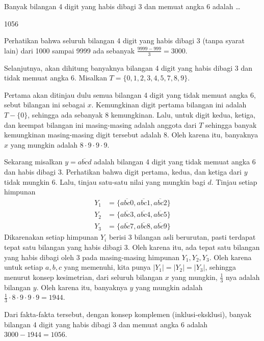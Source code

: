 \documentclass[12pt]{scrartcl}
\begin{document}
\begin{soalbaru}
Banyak bilangan 4 digit yang habis dibagi 3 dan memuat angka 6 adalah \dots
\end{soalbaru}
\begin{jawaban}
1056
\end{jawaban}
\begin{solusi}
Perhatikan bahwa seluruh bilangan 4 digit yang habis dibagi 3 (tanpa syarat lain) dari 1000 sampai 9999 ada sebanyak $\frac{9999-999}{3}=3000$. 

Selanjutnya, akan dihitung banyaknya bilangan 4 digit yang habis dibagi 3 dan tidak memuat angka 6. Misalkan $T = \{0,1,2,3,4,5,7,8,9\}$. 

Pertama akan ditinjau dulu semua bilangan 4 digit yang tidak memuat angka 6, sebut bilangan ini sebagai $x$. Kemungkinan digit pertama bilangan ini adalah $T - \{0\}$, sehingga ada sebanyak $8$ kemungkinan. Lalu, untuk digit kedua, ketiga, dan keempat bilangan ini masing-masing adalah anggota dari $T$ sehingga banyak kemungkinan masing-masing digit tersebut adalah 8. Oleh karena itu, banyaknya $x$ yang mungkin adalah $8 \cdot 9 \cdot 9 \cdot 9$.

Sekarang misalkan $y = \overline{abcd}$ adalah bilangan 4 digit yang tidak memuat angka 6 dan habis dibagi 3. Perhatikan bahwa digit pertama, kedua, dan ketiga dari $y$ tidak mungkin 6. Lalu, tinjau satu-satu nilai yang mungkin bagi $d$. Tinjau setiap himpunan 
\begin{align*}
Y_1 &=\{\overline{abc0},\overline{abc1},\overline{abc2}\}\\ 
Y_2 &=\{\overline{abc3},\overline{abc4},\overline{abc5}\}\\
Y_3 &=\{\overline{abc7},\overline{abc8},\overline{abc9}\}
\end{align*}
Dikarenakan setiap himpunan $Y_i$ berisi 3 bilangan asli berurutan, pasti terdapat tepat satu bilangan yang habis dibagi 3. Oleh karena itu, ada tepat satu bilangan yang habis dibagi oleh 3 pada masing-masing himpunan $Y_1,Y_2,Y_3$. Oleh karena untuk setiap $a,b,c$ yang memenuhi, kita punya $|Y_1|=|Y_2|=|Y_3|$, sehingga menurut konsep kesimetrian, dari seluruh bilangan $x$ yang mungkin, $\frac{1}{3}$ nya adalah bilangan $y$. Oleh karena itu, banyaknya $y$ yang mungkin adalah $\frac{1}{3}\cdot 8 \cdot 9 \cdot 9 \cdot 9 = 1944$.

Dari fakta-fakta tersebut, dengan konsep komplemen (inklusi-eksklusi), banyak bilangan 4 digit yang habis dibagi 3 dan memuat angka 6 adalah $3000-1944 = \boxed{1056}$.
\end{solusi}
\end{document}
